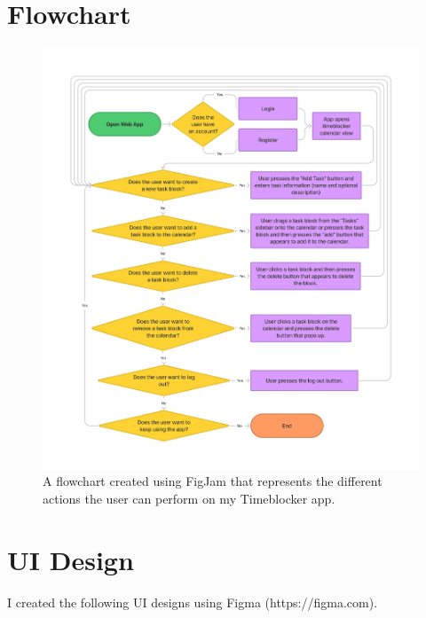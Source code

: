 \documentclass[12pt]{report}
\begin{document}
\section*{Flowchart}
\begin{figure}[H]
	\caption{A flowchart created using FigJam that represents the different actions the user can perform on my Timeblocker app.}
	\includegraphics[width=\textwidth]{flowchart.png}
\end{figure}

\section*{UI Design}

I created the following UI designs using Figma (https://figma.com).
\end{document}

